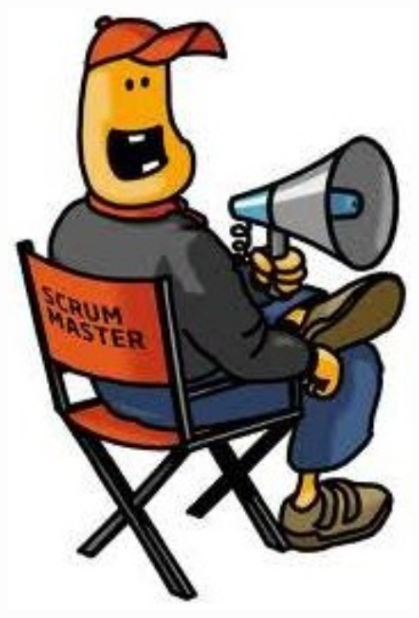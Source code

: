 \documentclass{../../slides-style}
\begin{document}
\begin{frame}
\begin{columns}
\begin{column}{0.3\textwidth}
\begin{center}
                    \includegraphics[width=0.8\textwidth]{scrumMaster.png}
                \end{center}
            \end{column}
        \end{columns}
    \end{frame}
\end{document}
